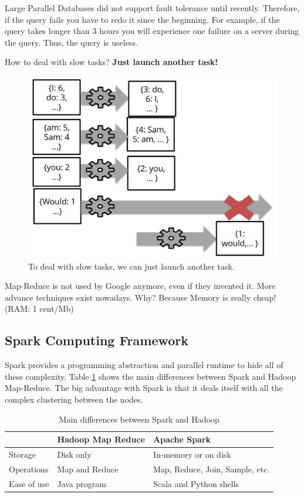 Large Parallel Databases did not support fault tolerance until recently. Therefore, if the query fails you have to redo it since the beginning. For example, if the query takes longer than 3 hours you will experience one failure on a server during the query. Thus, the query is useless.

How to deal with slow tasks? {\bf Just launch another task!}

\begin{figure}[H]%
 \centering
 \includegraphics[width=13cm]{./img/10/slow}
 \caption{\label{pic:failure} To deal with slow tasks, we can just launch another task.}
\end{figure}

Map-Reduce is not used by Google anymore, even if they invented it. More advance techniques exist nowadays. Why? Because Memory is really cheap! (RAM: 1 cent/Mb)

\subsection{Spark Computing Framework}

Spark provides a programming abstraction and parallel runtime to hide all of these complexity. Table \ref{tab:spark-hadoop} shows the main differences between Spark and Hadoop Map-Reduce. The big advantage with Spark is that it deals itself with all the complex clustering between the nodes.

\begin{table}[H]
 \begin{center}
  \begin{tabular}{l|l|l}
    & Hadoop Map Reduce & Apache Spark \\ \hline \hline
    Storage & Disk only & In-memory or on disk \\ \hline
    Operations & Map and Reduce & Map, Reduce, Join, Sample, etc. \\ \hline
    Ease of use & Java program & Scala and Python shells \\ \hline
  \end{tabular}
 \end{center}
 \caption{\label{tab:spark-hadoop} Main differences between Spark and Hadoop}
\end{table}

